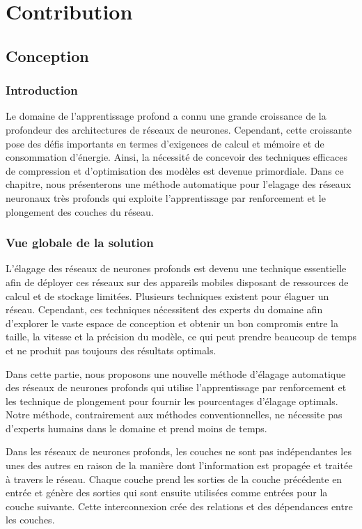 \part{Contribution}

\chapter{Conception}


\section{Introduction}
Le domaine de l'apprentissage profond a connu une grande croissance de la profondeur des architectures de réseaux de neurones. Cependant, cette croissante pose des défis importants en termes d'exigences de calcul et mémoire et de consommation d'énergie. Ainsi, la nécessité de concevoir des techniques efficaces de compression et d'optimisation des modèles est devenue primordiale. Dans ce chapitre, nous présenterons une méthode automatique pour l'elagage des réseaux neuronaux très profonds qui exploite l'apprentissage par renforcement et le plongement des couches du réseau.

\section{Vue globale de la solution}
L'élagage des réseaux de neurones profonds est devenu une technique essentielle afin de déployer ces réseaux sur des appareils mobiles disposant de ressources de calcul et de stockage limitées. Plusieurs techniques existent pour élaguer un réseau. Cependant, ces techniques nécessitent des experts du domaine afin d'explorer le vaste espace de conception et obtenir un bon compromis entre la taille, la vitesse et la précision du modèle, ce qui peut prendre beaucoup de temps et ne produit pas toujours des résultats optimals.

Dans cette partie, nous proposons une nouvelle méthode d'élagage automatique des réseaux de neurones profonds qui utilise l'apprentissage par renforcement et les technique de plongement pour fournir les pourcentages d'élagage optimals. Notre méthode, contrairement aux méthodes conventionnelles, ne nécessite pas d'experts humains dans le domaine et prend moins de temps.

Dans les réseaux de neurones profonds, les couches ne sont pas indépendantes les unes des autres en raison de la manière dont l'information est propagée et traitée à travers le réseau. Chaque couche prend les sorties de la couche précédente en entrée et génère des sorties qui sont ensuite utilisées comme entrées pour la couche suivante. Cette interconnexion crée des relations et des dépendances entre les couches.

